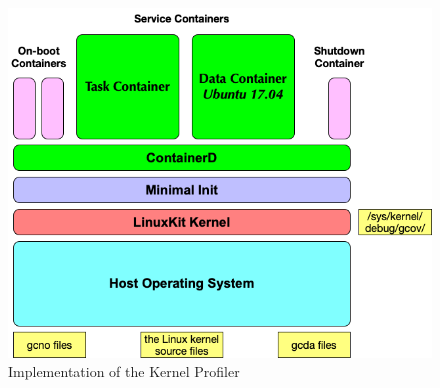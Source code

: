 \begin{figure}
\centering
\includegraphics[width=1.5\columnwidth]{diagram/linuxkit-kernel-profiler.png}
\caption{\small Implementation of the Kernel Profiler}
\label{fig:linuxkit-kernel-profiler}
\end{figure}

